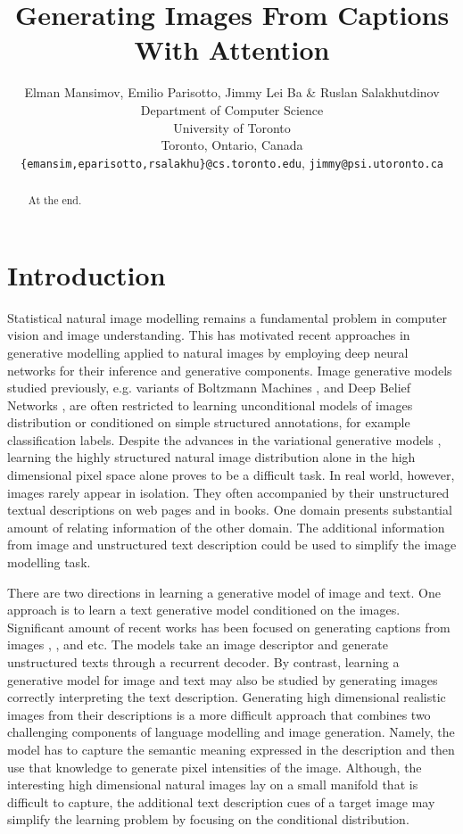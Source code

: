 \documentclass{article} %
\title{Generating Images From Captions\\ With Attention}
\author{
Elman Mansimov, Emilio Parisotto, Jimmy Lei Ba \& Ruslan Salakhutdinov\\
Department of Computer Science\\
University of Toronto\\
Toronto, Ontario, Canada \\
\texttt{\{emansim,eparisotto,rsalakhu\}@cs.toronto.edu}, \texttt{jimmy@psi.utoronto.ca}
}
\begin{document}
\maketitle

\begin{abstract}
At the end.
\end{abstract}

\section{Introduction}

Statistical natural image modelling remains a fundamental problem in computer vision and image understanding. This has motivated recent approaches in generative modelling applied to natural images by employing deep neural networks for their inference and generative components. Image generative models studied previously, e.g. variants of Boltzmann Machines \citep{smolensky_rbm}, \citep{russ_dbm} and Deep Belief Networks \citep{hinton_dbn}, are often restricted to learning unconditional models of images distribution or conditioned on simple structured annotations, for example classification labels. Despite the advances in the variational generative models \cite{kingma_vae}\cite{gregor_draw}, learning the highly structured natural image distribution alone in the high dimensional pixel space alone proves to be a difficult task. In real world, however, images rarely appear in isolation. They often accompanied by their unstructured textual descriptions on web pages and in books. One domain presents substantial amount of relating information of the other domain. The additional information from image and unstructured text description could be used to simplify the image modelling task.

There are two directions in learning a generative model of image and text.  One approach is to learn a text generative model conditioned on the images. Significant amount of recent works has been focused on generating captions from images \citep{karpathy_captions}, \citep{xu_captions}, \citep{kiros_captions} and etc. The models take an image descriptor and generate unstructured texts through a recurrent decoder. By contrast, learning a generative model for image and text may also be studied by generating images correctly interpreting the text description. 
Generating high dimensional realistic images from their descriptions is a more difficult approach that combines two challenging components of language modelling and image generation. Namely, the model has to capture the semantic meaning expressed in the description and then use that knowledge to generate pixel intensities of the image. Although, the interesting high dimensional natural images lay on a small manifold that is difficult to capture, the additional text description cues of a target image may simplify the learning problem by focusing on the conditional distribution.   
\end{document}
